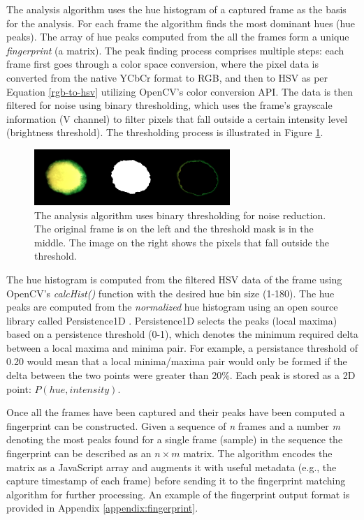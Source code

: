 \documentclass[thesis.tex]{subfiles}
\begin{document}
The analysis algorithm uses the hue histogram of a captured frame as the basis for the analysis. For each frame the algorithm finds the most dominant hues (hue peaks). The array of hue peaks computed from the all the frames form a unique \emph{fingerprint} (a matrix). The peak finding process comprises multiple steps: each frame first goes through a color space conversion, where the pixel data is converted from the native YCbCr format to RGB, and then to HSV as per Equation \ref{rgb-to-hsv} utilizing OpenCV's color conversion API. The data is then filtered for noise using binary thresholding, which uses the frame's grayscale information (V channel) to filter pixels that fall outside a certain intensity level (brightness threshold). The thresholding process is illustrated in Figure \ref{figure:binary-thresholding}.

\begin{figure}[h]
\centering \includegraphics[width=\textwidth,height=\textheight,keepaspectratio=true]{images/design_implementation/binary_thresholding}
\caption{The analysis algorithm uses binary thresholding for noise reduction. The original frame is on the left and the threshold mask is in the middle. The image on the right shows the pixels that fall outside the threshold.\label{figure:binary-thresholding}}
\end{figure}

The hue histogram is computed from the filtered HSV data of the frame using OpenCV's \emph{calcHist()} function with the desired hue bin size (1-180). The hue peaks are computed from the \emph{normalized} hue histogram using an open source library called Persistence1D \cite{persistence1d}. Persistence1D selects the peaks (local maxima) based on a persistence threshold (0-1), which denotes the minimum required delta between a local maxima and minima pair. For example, a persistance threshold of 0.20 would mean that a local minima/maxima pair would only be formed if the delta between the two points were greater than 20\%. Each peak is stored as a 2D point: $P(hue, intensity)$.

Once all the frames have been captured and their peaks have been computed a fingerprint can be constructed. Given a sequence of \emph{n} frames and a number \emph{m} denoting the most peaks found for a single frame (sample) in the sequence the fingerprint can be described as an $n \times m$ matrix. The algorithm encodes the matrix as a JavaScript array and augments it with useful metadata (e.g., the capture timestamp of each frame) before sending it to the fingerprint matching algorithm for further processing. An example of the fingerprint output format is provided in Appendix \ref{appendix:fingerprint}.
\end{document}
